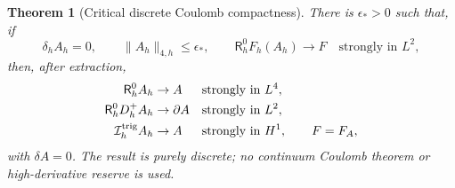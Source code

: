 \documentclass[11pt]{article}
\numberwithin{equation}{section}
\newtheorem{theorem}{Theorem}[section]
\theoremstyle{definition}
\theoremstyle{remark}
\newcommand{\norm}[1]{\lVert#1\rVert}
\begin{document}
\begin{theorem}[Critical discrete Coulomb compactness]
\label{thm:native-discrete-Coulomb}
There is $\epsilon_*>0$ such that, if
\begin{equation}
 \delta_hA_h=0,
 \qquad \norm{A_h}_{4,h}\le\epsilon_*,
 \qquad \mathsf R_h^0F_h(A_h)\to F\quad\text{strongly in }L^2,
 \label{eq:native-small-Coulomb}
\end{equation}
then, after extraction,
\begin{align}
 \mathsf R_h^0A_h&\to A &&\text{strongly in }L^4,\notag\\
 \mathsf R_h^0D_h^+A_h&\to\partial A &&\text{strongly in }L^2,\notag\\
 \mathcal I_h^{\rm trig}A_h&\to A &&\text{strongly in }H^1,
 \qquad F=F_A,
 \label{eq:native-Coulomb-strong}
\end{align}
with $\delta A=0$.  The result is purely discrete; no continuum Coulomb
theorem or high-derivative reserve is used.
\end{theorem}
\end{document}
